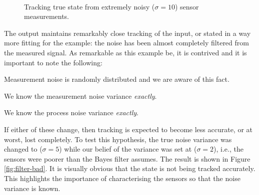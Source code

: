 \begin{figure}[h]
\centering
{}
 \\
\caption{Tracking true state from extremely noisy ($\sigma = 10$)
sensor measurements.}
\label{fig:filter}
\end{figure}

The output maintains remarkably close tracking of the input, or stated in a
way more fitting for the example: the noise has been almost completely filtered
from the measured signal. As remarkable as this example be, it is contrived and
it is important to note the following:
\begin{compactitem}
\item Measurement noise is randomly distributed and we are aware of this fact.
\item We know the measurement noise variance \emph{exactly}.
\item We know the process noise variance \emph{exactly}.
\end{compactitem}
If either of these change, then tracking is expected to become less accurate, or
at worst, lost completely. To test this hypothesis, the true noise variance was
changed to ($\sigma = 5$) while our belief of the variance was set at
($\sigma = 2$), i.e., the sensors were poorer than the Bayes filter assumes.
The result is shown in Figure \ref{fig:filter-bad}. It is
visually obvious that the state is not being tracked accurately. This highlights
the importance of characterising the sensors so that the noise variance is
known.

